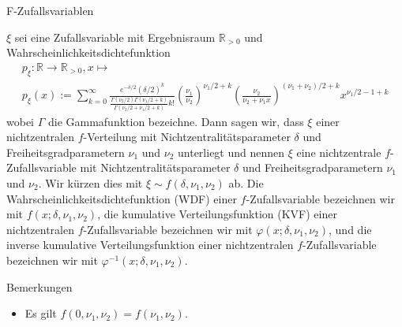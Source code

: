 \documentclass[
  8pt,
  ignorenonframetext,
]{beamer}
\providecommand{\tightlist}{%
  \setlength{\itemsep}{0pt}\setlength{\parskip}{0pt}}
\begin{document}
\begin{frame}{F-Zufallsvariablen}
\protect\hypertarget{f-zufallsvariablen-3}{}
\footnotesize
\begin{definition}
\justifying
$\xi$ sei eine Zufallsvariable mit Ergebnisraum $\mathbb{R}_{>0}$ und Wahrscheinlichkeitsdichtefunktion
\begin{multline}
p_\xi : \mathbb{R} \to \mathbb{R}_{>0}, x \mapsto \\
p_\xi(x)
:= \sum_{k=0}^\infty \frac{e^{-\delta/2}(\delta/2)^k}{\frac{\Gamma(\nu_2/2)\Gamma(\nu_1/2 + k)}{\Gamma(\nu_2/2 + \nu_1/2 + k)}k!}
    \left(\frac{\nu_1}{\nu_2}\right)^{\nu_1/2 + k}
    \left(\frac{\nu_2}{\nu_2+\nu_1x}\right)^{(\nu_1+\nu_2)/2 + k}
    x^{\nu_1/2 - 1 + k}
\end{multline}
wobei $\Gamma$ die Gammafunktion bezeichne. Dann sagen wir, dass $\xi$ einer
nichtzentralen $f$-Verteilung mit Nichtzentralitätsparameter $\delta$ und
Freiheitsgradparametern $\nu_1$ und $\nu_2$ unterliegt und nennen $\xi$ eine nichtzentrale
$f$-Zufallsvariable mit Nichtzentralitätsparameter $\delta$ und Freiheitsgradparametern
$\nu_1$ und $\nu_2$. Wir kürzen dies mit $\xi \sim f(\delta,\nu_1,\nu_2)$ ab.
Die Wahrscheinlichkeitsdichtefunktion (WDF) einer $f$-Zufallsvariable
bezeichnen wir mit $f(x;\delta,\nu_1,\nu_2)$, die kumulative Verteilungsfunktion (KVF)
einer nichtzentralen $f$-Zufallsvariable bezeichnen
wir mit $\varphi(x;\delta,\nu_1,\nu_2)$, und die inverse kumulative Verteilungsfunktion
einer nichtzentralen $f$-Zufallsvariable
bezeichnen wir mit $\varphi^{-1}(x;\delta,\nu_1,\nu_2)$.
\end{definition}

Bemerkungen

\begin{itemize}
\tightlist
\item
  Es gilt \(f(0,\nu_1,\nu_2) = f(\nu_1,\nu_2)\).
\end{itemize}
\end{frame}
\end{document}

